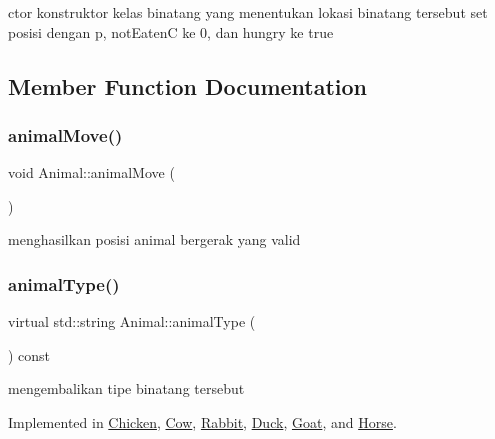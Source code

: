 ctor konstruktor kelas binatang yang menentukan lokasi binatang tersebut set posisi dengan p, not\+EatenC ke 0, dan hungry ke true 

\subsection{Member Function Documentation}
\mbox{\label{class_animal_a940eb3ed57dabe27518b0a78823594ae}} 
\subsubsection{\texorpdfstring{animalMove()}{animalMove()}}
{\footnotesize\ttfamily void Animal\+::animal\+Move (\begin{DoxyParamCaption}{ }\end{DoxyParamCaption})}

menghasilkan posisi animal bergerak yang valid \mbox{\label{class_animal_a1969cf8cf77a7900207420ae26f856e9}} 
\subsubsection{\texorpdfstring{animalType()}{animalType()}}
{\footnotesize\ttfamily virtual std\+::string Animal\+::animal\+Type (\begin{DoxyParamCaption}{ }\end{DoxyParamCaption}) const\hspace{0.3cm}{\ttfamily [pure virtual]}}

mengembalikan tipe binatang tersebut 

Implemented in \mbox{\hyperlink{class_chicken_a95e129b0b1230bd548eba900852e4810}{Chicken}}, \mbox{\hyperlink{class_cow_a18d91d74f3b32a7ba9fc6c1db80c17df}{Cow}}, \mbox{\hyperlink{class_rabbit_a26169c2de4f8cf4f72d51c0796b96a37}{Rabbit}}, \mbox{\hyperlink{class_duck_a90ea0823650fe49eddba0d24647dd1bd}{Duck}}, \mbox{\hyperlink{class_goat_a664be0f59f9504a4f632ae79ac964cf5}{Goat}}, and \mbox{\hyperlink{class_horse_a88104166c335f9a2c389968ab792037b}{Horse}}.

\mbox{\label{class_animal_a2810cff283192d06f93612364b8120f9}} 

